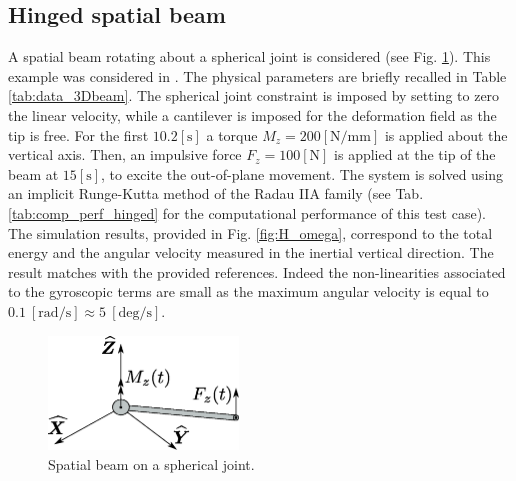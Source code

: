 \documentclass{svjour3}                     %
\newcommand{\secondRev}[1]{\textcolor{blue!80!black}{#1}}
\begin{document}
\subsection{Hinged spatial beam}
A spatial beam rotating about a spherical joint is considered (see Fig. \ref{fig:beam_3D}). This example was considered in \cite{Cardona2000,Ellenbroek2018}. The physical parameters are briefly recalled in Table \ref{tab:data_3Dbeam}. The spherical joint constraint is imposed by setting to zero the linear velocity, while a cantilever is imposed for the deformation field as the tip is free. For the first $10.2 [\mathrm{s}]$ a torque $ M_z =200 [\mathrm{N/mm}]$ is applied about the vertical axis. Then, an impulsive force $ F_z =100 [\mathrm{N}]$ is applied at the tip of the beam at $15 [\mathrm{s}]$, to excite the out-of-plane movement. The system is solved using an implicit Runge-Kutta method of the Radau IIA family \secondRev{(see Tab. \ref{tab:comp_perf_hinged} for the computational performance of this test case)}. The simulation results, provided in Fig. \ref{fig:H_omega}, correspond to the total energy and the angular velocity measured in the inertial vertical direction. The result matches with the provided references. Indeed the non-linearities associated to the gyroscopic terms are small as the maximum angular velocity is equal to $0.1 \ [\mathrm{rad/s}] \approx 5 \ [\mathrm{deg/s}]$. 

\begin{figure}[tb]
	\centering
	\includegraphics[width=0.45\textwidth]{rotbeam_3D.eps} 
	\caption{Spatial beam on a spherical joint.}
	\label{fig:beam_3D}
\end{figure}
\end{document}
